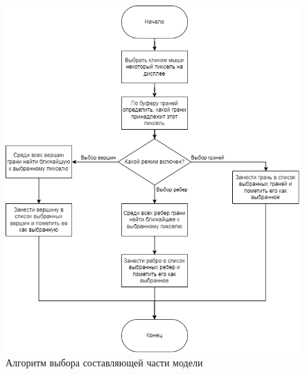 \begin{figure}[h]
	\centering
	\includegraphics[scale=0.7]{inc/img/selection.png}
	\caption{Алгоритм выбора составляющей части модели}
	\label{fig:selection}
\end{figure} 



